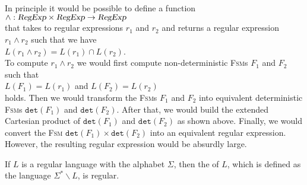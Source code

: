 \remarkEng
In principle it would be possible to define a function
\\[0.2cm]
\hspace*{1.3cm}
$\wedge: \textsl{RegExp} \times \textsl{RegExp} \rightarrow \textsl{RegExp}$
\\[0.2cm]
that takes to regular expressions $r_1$ and $r_2$ and returns a regular expression  $r_1 \wedge r_2$ such that
we have
\\[0.2cm]
\hspace*{1.3cm}
$L(r_1 \wedge r_2) = L(r_1) \cap L(r_2)$.
\\[0.2cm]
To compute $r_1 \wedge r_2$ we would first compute non-deterministic \textsc{Fsm}s  $F_1$ and $F_2$ such that
\\[0.2cm]
\hspace*{1.3cm}
$L(F_1) = L(r_1)$ \quad and \quad $L(F_2) = L(r_2)$
\\[0.2cm] 
holds.  Then we would transform the \textsc{Fsm}s $F_1$ and $F_2$ into equivalent deterministic 
\textsc{Fsm}s $\mathtt{det}(F_1)$ and $\mathtt{det}(F_2)$.  After that, we would build
the extended Cartesian product of $\mathtt{det}(F_1)$ and $\mathtt{det}(F_2)$ as shown above. 
Finally, we would convert the \textsc{Fsm} $\mathtt{det}(F_1) \times\mathtt{det}(F_2)$ into an equivalent
regular expression.  However, the resulting regular expression would be absurdly large.
\eox


\begin{Proposition}
  If $L$ is a regular language with the alphabet $\Sigma$, then the  
  of $L$, which is defined as the language $\Sigma^* \backslash L$, is regular.
\end{Proposition}

